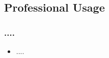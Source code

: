 \subsection{Professional Usage}

\begin{frame}
\frametitle{....}

  \begin{itemize}
    \item ....    
  \end{itemize}
  
\end{frame}




